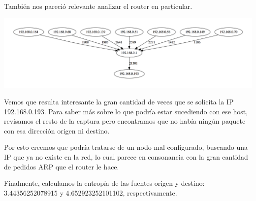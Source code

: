 También nos pareció relevante analizar el router en particular.\newline

\includegraphics[scale=0.3]{graphics/t-work-router-1000w.png}

Vemos que resulta interesante la gran cantidad de veces que se solicita la IP 192.168.0.193. Para saber más sobre lo que podría estar sucediendo con ese host, revisamos el resto de la captura pero encontramos que no había ningún paquete con esa dirección origen ni destino.\newline

Por esto creemos que podría tratarse de un nodo mal configurado, buscando una IP que ya no existe en la red, lo cual parece en consonancia con la gran cantidad de pedidos ARP que el router le hace.\newline

Finalmente, calculamos la entropía de las fuentes origen y destino: 3.44356252078915 y 4.652923252101102, respectivamente.\newline
